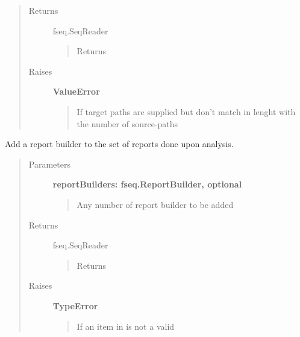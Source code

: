 \documentclass[letterpaper,10pt,english]{sphinxmanual}
\begin{document}
\begin{fulllineitems}
\begin{fulllineitems}
\begin{quote}
\begin{description}
\begin{quote}
\begin{description}
\end{description}
\end{quote}

\item[{Returns}] \leavevmode
fseq.SeqReader
\begin{quote}

Returns 
\end{quote}

\item[{Raises}] \leavevmode
\textbf{ValueError}
\begin{quote}

If target paths are supplied but don't match in lenght with the
number of source-paths
\end{quote}

\end{description}\end{quote}

\end{fulllineitems}


\begin{fulllineitems}
\label{fseq.reading:fseq.reading.seq_reader.SeqReader.addReportBuilders}
Add a report builder to the set of reports done upon analysis.
\begin{quote}\begin{description}
\item[{Parameters}] \leavevmode
\textbf{reportBuilders: fseq.ReportBuilder, optional}
\begin{quote}

Any number of report builder to be added
\end{quote}

\item[{Returns}] \leavevmode
fseq.SeqReader
\begin{quote}

Returns 
\end{quote}

\item[{Raises}] \leavevmode
\textbf{TypeError}
\begin{quote}

If an item in  is not a valid
\end{quote}

\end{description}\end{quote}


\end{fulllineitems}
\end{fulllineitems}
\end{document}
